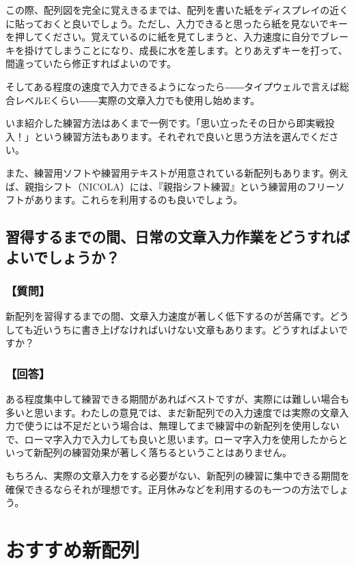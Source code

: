 この際、配列図を完全に覚えきるまでは、配列を書いた紙をディスプレイの近くに貼っておくと良いでしょう。ただし、入力できると思ったら紙を見ないでキーを押してください。覚えているのに紙を見てしまうと、入力速度に自分でブレーキを掛けてしまうことになり、成長に水を差します。とりあえずキーを打って、間違っていたら修正すればよいのです。

そしてある程度の速度で入力できるようになったら――タイプウェルで言えば総合レベルEくらい――実際の文章入力でも使用し始めます。

いま紹介した練習方法はあくまで一例です。「思い立ったその日から即実戦投入！」という練習方法もあります。それぞれで良いと思う方法を選んでください。

また、練習用ソフトや練習用テキストが用意されている新配列もあります。例えば、親指シフト（NICOLA）には、『親指シフト練習』という練習用のフリーソフトがあります。これらを利用するのも良いでしょう。

\subsection{習得するまでの間、日常の文章入力作業をどうすればよいでしょうか？}

\subsubsection*{【質問】}

新配列を習得するまでの間、文章入力速度が著しく低下するのが苦痛です。どうしても近いうちに書き上げなければいけない文章もあります。どうすればよいですか？

\subsubsection*{【回答】}

ある程度集中して練習できる期間があればベストですが、実際には難しい場合も多いと思います。わたしの意見では、まだ新配列での入力速度では実際の文章入力で使うには不足だという場合は、無理してまで練習中の新配列を使用しないで、ローマ字入力で入力しても良いと思います。ローマ字入力を使用したからといって新配列の練習効果が著しく落ちるということはありません。

もちろん、実際の文章入力をする必要がない、新配列の練習に集中できる期間を確保できるならそれが理想です。正月休みなどを利用するのも一つの方法でしょう。

\section{おすすめ新配列}

